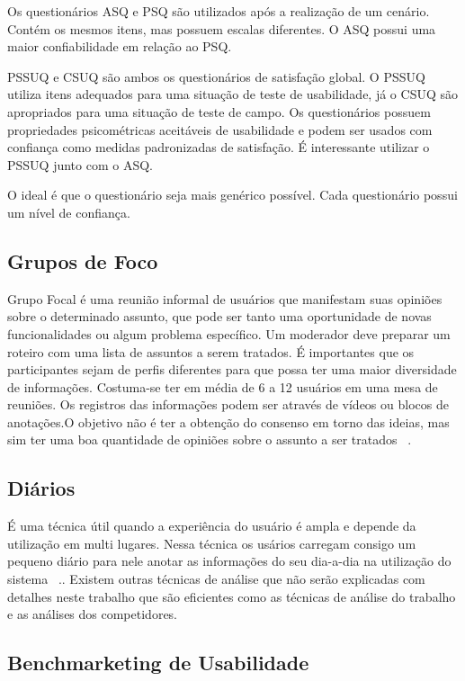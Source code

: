 	Os questionários ASQ e PSQ são utilizados após a realização de um cenário. Contém os mesmos itens, mas possuem escalas diferentes. O ASQ possui uma maior confiabilidade em relação ao PSQ. 

	PSSUQ e CSUQ são ambos os questionários de satisfação global. O PSSUQ utiliza itens adequados para uma situação de teste de usabilidade, já o CSUQ são apropriados para uma situação de teste de campo. Os questionários possuem propriedades psicométricas aceitáveis de usabilidade e podem ser usados com confiança como medidas padronizadas de satisfação. É interessante utilizar o PSSUQ junto com o ASQ.

	O ideal é que o questionário seja mais genérico possível. Cada questionário possui um nível de confiança.


\subsection{Grupos de Foco}

	Grupo Focal é uma reunião informal de usuários que manifestam suas opiniões sobre o determinado assunto, que pode ser tanto uma oportunidade de novas funcionalidades ou algum problema específico.
	Um moderador deve preparar um roteiro  com uma lista de assuntos a serem tratados. É importantes que os participantes sejam de perfis diferentes para que possa ter uma maior diversidade de informações. Costuma-se ter em média de 6 a 12 usuários em uma mesa de reuniões. Os registros das informações podem ser através de vídeos ou blocos de anotações.O objetivo não é ter a obtenção do consenso em torno das ideias, mas sim ter uma boa quantidade de opiniões sobre o assunto a ser tratados ~\cite{cybis2010}.


\subsection{Diários}

	É uma técnica útil quando a experiência do usuário é ampla e depende da utilização em multi lugares. Nessa técnica os usários carregam consigo um pequeno diário para nele anotar as informações do seu dia-a-dia na utilização do sistema ~\cite{cybis2010}..
	Existem outras técnicas de análise que não serão explicadas com detalhes neste trabalho que são eficientes como as técnicas de análise do trabalho e as análises dos competidores.

\subsection{Benchmarketing de Usabilidade}

